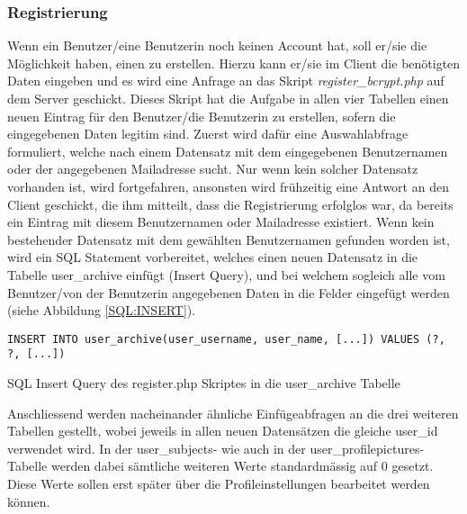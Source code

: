 \documentclass[../main.tex]{subfiles}
\begin{document}
	 
	 \subsubsection{Registrierung}
	 Wenn ein Benutzer/eine Benutzerin noch keinen Account hat, soll er/sie die Möglichkeit haben, einen zu erstellen. Hierzu kann er/sie im Client die benötigten Daten eingeben und es wird eine Anfrage an das Skript \emph{register\_bcrypt.php} auf dem Server geschickt. Dieses Skript hat die Aufgabe in allen vier Tabellen einen neuen Eintrag für den Benutzer/die Benutzerin zu erstellen, sofern die eingegebenen Daten legitim sind. Zuerst wird dafür eine Auswahlabfrage formuliert, welche nach einem Datensatz mit dem eingegebenen Benutzernamen oder der angegebenen Mailadresse sucht. Nur wenn kein solcher Datensatz vorhanden ist, wird fortgefahren, ansonsten wird frühzeitig eine Antwort an den Client geschickt, die ihm mitteilt, dass die Registrierung erfolglos war, da bereits ein Eintrag mit diesem Benutzernamen oder Mailadresse existiert. Wenn kein bestehender Datensatz mit dem gewählten Benutzernamen gefunden worden ist, wird ein SQL Statement vorbereitet, welches einen neuen Datensatz in die Tabelle user\_archive einfügt (Insert Query), und bei welchem sogleich alle vom Benutzer/von der Benutzerin angegebenen Daten in die Felder eingefügt werden (siehe Abbildung \ref{SQL:INSERT}).
	 
	 \begin{code} 
	 	\begin{center}
	 		\begin{verbatim}
INSERT INTO user_archive(user_username, user_name, [...]) VALUES (?, ?, [...])
	 		\end{verbatim}
	 		\caption{SQL Insert Query des register.php Skriptes in die user\_archive Tabelle}\label{SQL:INSERT}
	 	\end{center}
	 \end{code}
	 
	 Anschliessend werden nacheinander ähnliche Einfügeabfragen an die drei weiteren Tabellen gestellt, wobei jeweils in allen neuen Datensätzen die gleiche user\_id verwendet wird. In der user\_subjects- wie auch in der user\_profilepictures-Tabelle werden dabei sämtliche weiteren Werte standardmässig auf 0 gesetzt. Diese Werte sollen erst später über die Profileinstellungen bearbeitet werden können. 
	 
\end{document}
